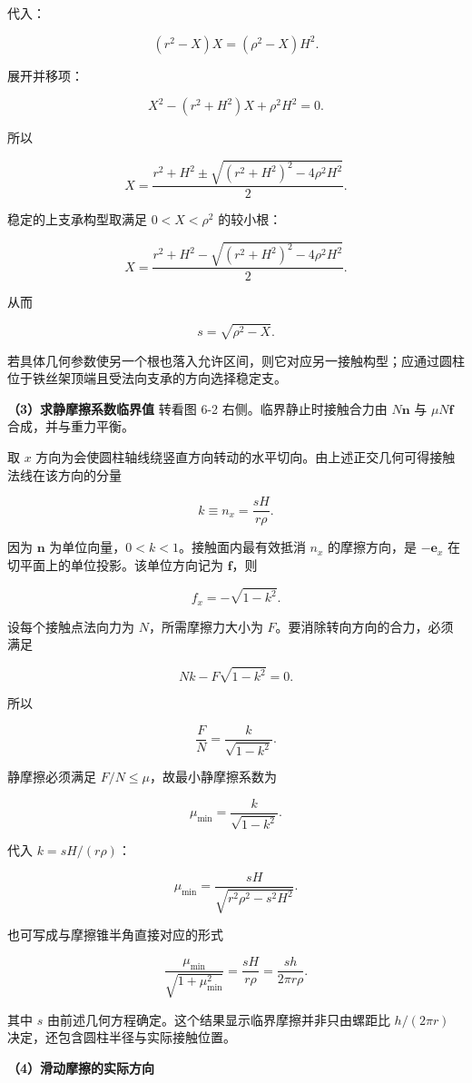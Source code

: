 \documentclass[12pt,a4paper,UTF8]{ctexart}
\begin{document}
代入：

\[(r^2-X)X=(\rho^2-X)H^2.\]

展开并移项：

\[X^2-(r^2+H^2)X+\rho^2H^2=0.\]

所以

\[X=\frac{r^2+H^2\pm
\sqrt{(r^2+H^2)^2-4\rho^2H^2}}{2}.\]

稳定的上支承构型取满足 \(0<X<\rho^2\) 的较小根：

\[\boxed{
X=\frac{r^2+H^2-
\sqrt{(r^2+H^2)^2-4\rho^2H^2}}{2}
}.\]

从而

\[\boxed{s=\sqrt{\rho^2-X}}.\]

若具体几何参数使另一个根也落入允许区间，则它对应另一接触构型；应通过圆柱位于铁丝架顶端且受法向支承的方向选择稳定支。

\textbf{（3）求静摩擦系数临界值} 转看图 6-2 右侧。临界静止时接触合力由
\(N\bm n\) 与 \(\mu N\bm f\) 合成，并与重力平衡。

取 \(x\)
方向为会使圆柱轴线绕竖直方向转动的水平切向。由上述正交几何可得接触法线在该方向的分量

\[\boxed{
k\equiv n_x=\frac{sH}{r\rho}
}.\]

因为 \(\bm n\) 为单位向量，\(0<k<1\)。接触面内最有效抵消 \(n_x\)
的摩擦方向，是 \(-\bm e_x\) 在切平面上的单位投影。该单位方向记为
\(\bm f\)，则

\[f_x=-\sqrt{1-k^2}.\]

设每个接触点法向力为 \(N\)，所需摩擦力大小为
\(F\)。要消除转向方向的合力，必须满足

\[Nk-F\sqrt{1-k^2}=0.\]

所以

\[\frac FN=\frac{k}{\sqrt{1-k^2}}.\]

静摩擦必须满足 \(F/N\le\mu\)，故最小静摩擦系数为

\[\boxed{
\mu_{\min}=\frac{k}{\sqrt{1-k^2}}
}.\]

代入 \(k=sH/(r\rho)\)：

\[\boxed{
\mu_{\min}=
\frac{sH}{\sqrt{r^2\rho^2-s^2H^2}}
}.\]

也可写成与摩擦锥半角直接对应的形式

\[\boxed{
\frac{\mu_{\min}}{\sqrt{1+\mu_{\min}^2}}
=\frac{sH}{r\rho}
=\frac{sh}{2\pi r\rho}
}.\]

其中 \(s\) 由前述几何方程确定。这个结果显示临界摩擦并非只由螺距比
\(h/(2\pi r)\) 决定，还包含圆柱半径与实际接触位置。

\textbf{（4）滑动摩擦的实际方向}
\end{document}
